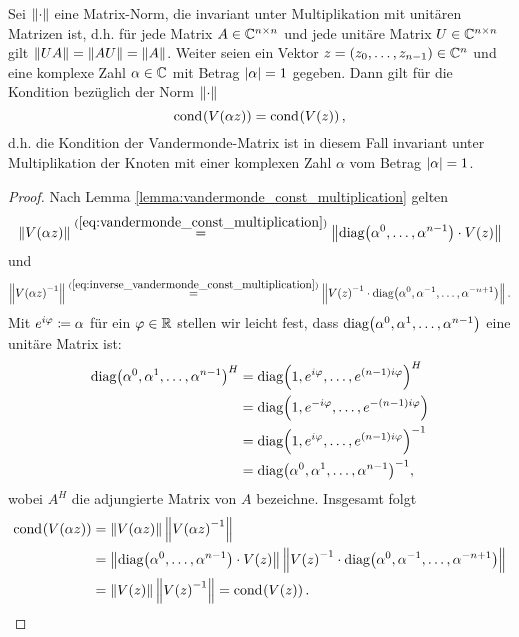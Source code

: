 \begin{lemma}
    Sei $\left\lVert \cdot \right\rVert$ eine Matrix-Norm, die invariant unter Multiplikation mit unitären
    Matrizen ist, d.h. für jede Matrix $A \in \mathbb{C}^{n\times n}$ und jede
    unitäre Matrix $U \in \mathbb{C}^{n\times n}$ gilt $\left\lVert UA \right\rVert = \left\lVert AU \right\rVert = \left\lVert A \right\rVert$.
    Weiter seien ein Vektor $z = (z_0, \dots, z_{n-1}) \in \mathbb{C}^n$ und eine
    komplexe Zahl $\alpha \in \mathbb{C}$ mit Betrag $\left\lvert \alpha \right\rvert = 1$ gegeben.
    Dann gilt für die Kondition bezüglich der Norm $\left\lVert \cdot \right\rVert$
    \[
        \text{cond}_{{}}\! \left( V \! \left( \alpha z \right) \right) = \text{cond}_{{}}\! \left( V \! \left( z \right) \right),
    \]
    d.h. die Kondition der Vandermonde-Matrix ist in diesem Fall invariant
    unter Multiplikation der Knoten mit einer komplexen Zahl $\alpha$ vom
    Betrag $\left\lvert \alpha \right\rvert = 1$.
\end{lemma}
\begin{proof}
    Nach Lemma \ref{lemma:vandermonde_const_multiplication} gelten
    \[
        \left\lVert  V \! \left( \alpha z \right)  \right\rVert
        \overset{(\ref{eq:vandermonde_const_multiplication})}{=}
            \left\lVert \text{diag$ \left( \alpha^0, \dots, \alpha^{n-1} \right)$} \cdot V \! \left( z \right) \right\rVert
    \]
    und
    \[
        \left\lVert  V \! \left( \alpha z \right)^{-1}  \right\rVert
        \overset{(\ref{eq:inverse_vandermonde_const_multiplication})}{=}
            \left\lVert V \! \left( z \right)^{-1} \cdot \text{diag$ \left( \alpha^0, \alpha^{-1}, \dots, \alpha^{-n+1} \right)$} \right\rVert.
    \]
    Mit $e^{i \varphi} \coloneqq \alpha$ für ein $\varphi \in \mathbb{R}$ stellen wir
    leicht fest, dass
    $\text{diag$ \left( \alpha^0, \alpha^1, \dots, \alpha^{n-1} \right)$}$ eine unitäre Matrix ist:
    \[
        \begin{split}
            \text{diag$ \left( \alpha^0, \alpha^1, \dots, \alpha^{n-1} \right)$}^H
            &= \text{diag$ \left( 1, e^{i \varphi}, \dots, e^{(n-1) i \varphi} \right)$}^H\\
            &= \text{diag$ \left( 1, e^{-i \varphi}, \dots, e^{-(n-1) i \varphi} \right)$}\\
            &= \text{diag$ \left( 1, e^{i \varphi}, \dots, e^{(n-1) i \varphi} \right)$}^{-1}\\
            &= \text{diag$ \left( \alpha^0, \alpha^1, \dots, \alpha^{n-1} \right)$}^{-1},
        \end{split}
    \]
    wobei $A^H$ die adjungierte Matrix von $A$ bezeichne.
    \noindent Insgesamt folgt
    \[
        \begin{split}
            \cond{\Vand{\alpha z}}
            &= \norm{\Vand{\alpha z}} \norm{\Vand{\alpha z}^{-1}}\\
            &= \norm{\diag{\alpha^0, \dots, \alpha^{n-1}} \cdot \Vand{z}} \norm{\Vand{z}^{-1} \cdot \diag{\alpha^0, \alpha^{-1}, \dots, \alpha^{-n+1}}}\\
            &= \norm{\Vand{z}} \norm{\Vand{z}^{-1}}
            = \cond{\Vand{z}}.
        \end{split}
    \]
\end{proof}

